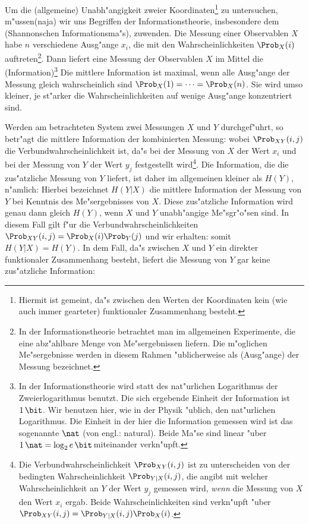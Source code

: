 Um die \begriff(allgemeine) Unabh"angigkeit zweier Koordinaten\footnote{Hiermit ist
  gemeint, da"s zwischen den Werten der Koordinaten kein (wie auch immer gearteter)
  funktionaler Zusammenhang besteht.} zu untersuchen,
m"ussen\korrektur(naja) wir uns Begriffen der Informationstheorie, insbesondere dem
\begriff(Shannonschen Informationsma"s), zuwenden. Die Messung einer Observablen $X$ habe
$n$ verschiedene Ausg"ange $x_i$, die mit den Wahrscheinlichkeiten $\Prob_X(i)$
auftreten\footnote{In der Informationstheorie betrachtet man im allgemeinen  Experimente, 
  die eine abz"ahlbare Menge von Me"sergebnissen liefern. Die m"oglichen Me"sergebnisse
  werden in diesem Rahmen "ublicherweise als \begriff(Ausg"ange) der Messung bezeichnet.}.
Dann liefert eine Messung der Observablen $X$ im Mittel die
\begriff(Information)\footnote{In der Informationstheorie wird statt des nat"urlichen
  Logarithmus der Zweierlogarithmus benutzt. Die sich ergebende Einheit der Information
  ist $1\,\bit$. Wir benutzen hier, wie in der Physik "ublich, den nat"urlichen
  Logarithmus. Die Einheit in der hier die Information gemessen wird ist das sogenannte
  $\nat$ (von engl.: natural). Beide Ma"se sind linear "uber $1\,\nat =\log_2
  e\,\bit\,$miteinander verkn"upft.}
Die
mittlere Information ist maximal, wenn alle Ausg"ange der Messung gleich wahrscheinlich
sind $\Prob_X(1)=\dots=\Prob_X(n)$. Sie wird umso kleiner, je st"arker die
Wahrscheinlichkeiten auf wenige Ausg"ange konzentriert sind.

Werden am betrachteten System zwei Messungen $X$ und $Y$ durchgef"uhrt, so betr"agt die
mittlere Information der kombinierten Messung:
wobei $\Prob_{XY}(i,j)$ die Verbundwahrscheinlichkeit ist, da"s bei der
Messung von $X$ der Wert $x_i$ und bei der Messung von $Y$ der Wert $y_j$ festgestellt
wird\footnote{Die Verbundwahrscheinlichkeit $\Prob_{XY}(i,j)$ ist zu unterscheiden von der
  bedingten Wahrscheinlichkeit $\Prob_{Y|X}(i,j)$, die angibt mit welcher
  Wahrscheinlichkeit an $Y$ der Wert $y_j$ gemessen wird, \emph{wenn} die Messung von $X$
  den Wert $x_i$ ergab. Beide Wahrscheinlichkeiten sind verkn"upft "uber
  $\Prob_{XY}(i,j)=\Prob_{Y|X}(i,j)\Prob_X(i)$.}.  Die Information,
die die zus"atzliche Messung von $Y$ liefert, ist daher im allgemeinen  kleiner als $H(Y)$,
n"amlich:
Hierbei bezeichnet $H(Y|X)$ die mittlere Information der
Messung von $Y$ bei Kenntnis des Me"sergebnisses von $X$. Diese zus"atzliche Information
wird genau dann gleich $H(Y)$, wenn $X$ und $Y$ unabh"angige Me"sgr"o"sen sind. In diesem
Fall gilt f"ur die Verbundwahrscheinlichkeiten $\Prob_{XY}(i,j)=\Prob_X(i)\Prob_Y(j)$ und
wir erhalten:
 somit $H(Y|X)=H(Y)$. In dem Fall, da"s zwischen $X$ und $Y$ ein direkter
funktionaler Zusammenhang besteht, liefert die Messung von $Y$ gar keine zus"atzliche
Information: 

